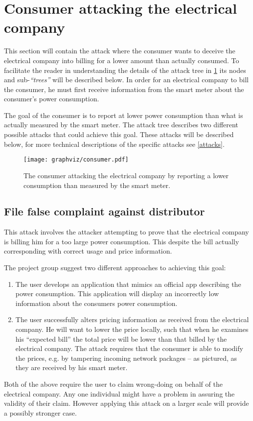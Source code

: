 
\section{Consumer attacking the electrical company}\label{attacks:consumer_vs_electrical}
This section will contain the attack where the consumer wants to deceive the electrical company into billing for a lower amount than actually consumed.
To facilitate the reader in understanding the details of the attack tree in \cref{report_power_attack_tree} its nodes and sub-\emph{``trees''} will be described below.
In order for an electrical company to bill the consumer, he must first receive information from the smart meter about the consumer's power consumption.

The goal of the consumer is to report at lower power consumption than what is actually measured by the smart meter.
The attack tree describes two different possible attacks that could achieve this goal.
These attacks will be described below, for more technical descriptions of the specific attacks see \cref{attacks}.

\begin{figure}[H]
  \texttt{[image: graphviz/consumer.pdf]}
  \caption{The consumer attacking the electrical company by reporting a lower consumption than measured by the smart meter.}
  \label{report_power_attack_tree}
\end{figure}

\subsection{File false complaint against distributor}
This attack involves the attacker attempting to prove that the electrical company is billing him for a too large power consumption.
This despite the bill actually corresponding with correct usage and price information.

The project group suggest two different approaches to achieving this goal:
\begin{enumerate}
  \item The user develops an application that mimics an official app describing the power consumption.
  This application will display an incorrectly low information about the consumers power consumption.
  \item The user successfully alters pricing information as received from the electrical company.
  He will want to lower the price locally, such that when he examines his ``expected bill'' the total price will be lower than that billed by the electrical company.
  The attack requires that the consumer is able to modify the prices, e.g. by tampering incoming network packages -- as pictured, as they are received by his smart meter.
\end{enumerate}
Both of the above require the user to claim wrong-doing on behalf of the electrical company.
Any one individual might have a problem in assuring the validity of their claim.
However applying this attack on a larger scale will provide a possibly stronger case.

